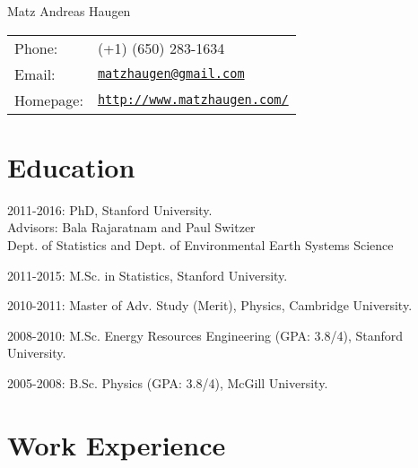 \documentclass[letterpaper, 12pt]{article}
\def\name{Matz Andreas Haugen}
\renewenvironment{itemize}{
  \begin{list}{}{
    \setlength{\leftmargin}{1.5em}
  }
}{
  \end{list}
}
\begin{document}
{\huge \name}


\vspace{0.25in}

\begin{minipage}{0.45\linewidth}
  \begin{tabular}{ll}
    Phone: & (+1) (650) 283-1634 \\
    Email: & \href{mailto:matzhaugen@gmail.com}{\tt matzhaugen@gmail.com} \\
    Homepage: & \href{http://www.matzhaugen.com/}{\tt http://www.matzhaugen.com/} \\
  \end{tabular}
\end{minipage}

\section*{Education}

\begin{itemize}

  \item 2011-2016: PhD, Stanford University. \\
   Advisors: Bala Rajaratnam and Paul Switzer \\Dept. of Statistics and Dept. of Environmental Earth Systems Science
   

  \item 2011-2015: M.Sc. in Statistics, Stanford University.

  \item 2010-2011: Master of Adv. Study (Merit), Physics, Cambridge University.

  \item 2008-2010: M.Sc. Energy Resources Engineering (GPA: 3.8/4), Stanford University.

  \item 2005-2008: B.Sc. Physics (GPA: 3.8/4), McGill University.
\end{itemize}

\section*{Work Experience}
\end{document}
